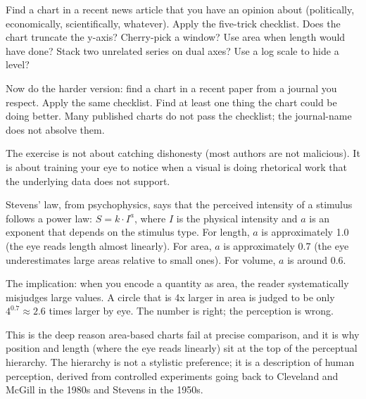 \documentclass[
  letterpaper,
  11pt,
  twoside,
  openany]{scrbook}
\begin{document}
\begin{tcolorbox}[enhanced jigsaw, arc=.35mm, bottomrule=.15mm, bottomtitle=1mm, breakable, colback=white, colbacktitle=quarto-callout-tip-color!10!white, colframe=quarto-callout-tip-color-frame, coltitle=black, left=2mm, leftrule=.75mm, opacityback=0, opacitybacktitle=0.6, rightrule=.15mm, title=\textcolor{quarto-callout-tip-color}{\faLightbulb}\hspace{0.5em}{Try this}, titlerule=0mm, toprule=.15mm, toptitle=1mm]

Find a chart in a recent news article that you have an opinion about
(politically, economically, scientifically, whatever). Apply the
five-trick checklist. Does the chart truncate the y-axis? Cherry-pick a
window? Use area when length would have done? Stack two unrelated series
on dual axes? Use a log scale to hide a level?

Now do the harder version: find a chart in a recent paper from a journal
you respect. Apply the same checklist. Find at least one thing the chart
could be doing better. Many published charts do not pass the checklist;
the journal-name does not absolve them.

The exercise is not about catching dishonesty (most authors are not
malicious). It is about training your eye to notice when a visual is
doing rhetorical work that the underlying data does not support.

\end{tcolorbox}

\begin{tcolorbox}[enhanced jigsaw, arc=.35mm, bottomrule=.15mm, bottomtitle=1mm, breakable, colback=white, colbacktitle=quarto-callout-note-color!10!white, colframe=quarto-callout-note-color-frame, coltitle=black, left=2mm, leftrule=.75mm, opacityback=0, opacitybacktitle=0.6, rightrule=.15mm, title=\textcolor{quarto-callout-note-color}{\faInfo}\hspace{0.5em}{Inside the math: why the eye fails on area}, titlerule=0mm, toprule=.15mm, toptitle=1mm]

Stevens' law, from psychophysics, says that the perceived intensity of a
stimulus follows a power law: \(S = k \cdot I^a\), where \(I\) is the
physical intensity and \(a\) is an exponent that depends on the stimulus
type. For length, \(a\) is approximately 1.0 (the eye reads length
almost linearly). For area, \(a\) is approximately 0.7 (the eye
underestimates large areas relative to small ones). For volume, \(a\) is
around 0.6.

The implication: when you encode a quantity as area, the reader
systematically misjudges large values. A circle that is 4x larger in
area is judged to be only \(4^{0.7} \approx 2.6\) times larger by eye.
The number is right; the perception is wrong.

This is the deep reason area-based charts fail at precise comparison,
and it is why position and length (where the eye reads linearly) sit at
the top of the perceptual hierarchy. The hierarchy is not a stylistic
preference; it is a description of human perception, derived from
controlled experiments going back to Cleveland and McGill in the 1980s
and Stevens in the 1950s.

\end{tcolorbox}
\end{document}
